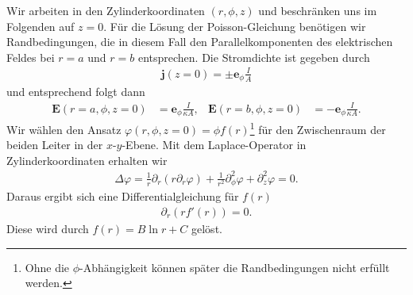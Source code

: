 \documentclass{article}
\renewcommand{\vec}{\boldsymbol}
\begin{document}
Wir arbeiten in den Zylinderkoordinaten $(r, \phi, z)$ und beschränken uns im Folgenden auf $z=0$. 
Für die Lösung der Poisson-Gleichung benötigen wir Randbedingungen, die in diesem Fall den Parallelkomponenten des elektrischen Feldes bei $r = a$ und $r = b$ entsprechen.
Die Stromdichte ist gegeben durch
\begin{align*}
    \vec{j}(z=0) = \pm\vec{e}_\phi \frac{I}{A}
\end{align*}
und entsprechend folgt dann
\begin{align*}
    \vec{E}(r = a, \phi, z=0) &= \vec{e}_\phi \frac{I}{\kappa A}, &\vec{E}(r = b, \phi, z=0) &=-\vec{e}_\phi \frac{I}{\kappa A}.
\end{align*}
Wir wählen den Ansatz $\varphi(r, \phi, z = 0) = \phi f(r)$\footnote{Ohne die $\phi$-Abhängigkeit können später die Randbedingungen nicht erfüllt werden.} für den Zwischenraum der beiden Leiter in der $x$-$y$-Ebene.
Mit dem Laplace-Operator in Zylinderkoordinaten erhalten wir
\begin{align*}
    \Delta \varphi = \frac{1}{r} \partial_r \left(r \partial_r \varphi\right) + \frac{1}{r^2} \partial_\phi^2 \varphi + \partial_z^2 \varphi = 0.
\end{align*}
Daraus ergibt sich eine Differentialgleichung für $f(r)$ 
\begin{align*}
    \partial_r (r f'(r)) = 0.
\end{align*}
Diese wird durch $f(r) = B \ln r + C$ gelöst.
\end{document}
